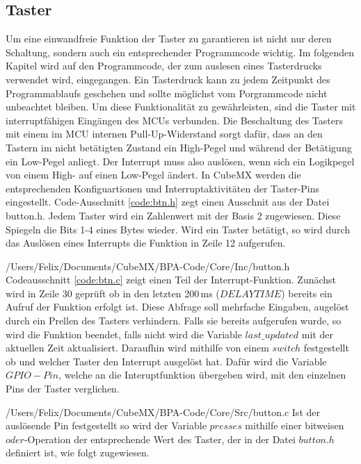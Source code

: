
\subsection{Taster}
Um eine einwandfreie Funktion der Taster zu garantieren ist nicht nur deren Schaltung, sondern auch ein entsprechender Programmcode wichtig. Im folgenden Kapitel wird auf den Programmcode, der zum auslesen eines Tasterdrucks verwendet wird, eingegangen. Ein Tasterdruck kann zu jedem Zeitpunkt des Programmablaufs geschehen und sollte möglichst vom Porgrammcode nicht unbeachtet bleiben. Um diese Funktionalität zu gewährleisten, sind die Taster mit interruptfähigen Eingängen des MCUs verbunden. Die Beschaltung des Tasters mit einem im MCU internen Pull-Up-Widerstand sorgt dafür, dass an den Tastern im nicht betätigten Zustand ein High-Pegel und während der Betätigung ein Low-Pegel anliegt. Der Interrupt muss also auslösen, wenn sich ein Logikpegel von einem High- auf einen Low-Pegel ändert. In CubeMX werden die entsprechenden Konfiguartionen und Interruptaktivitäten der Taster-Pins eingestellt. Code-Ausschnitt \ref{code:btn.h} zegt einen Ausschnit aus der Datei button.h. Jedem Taster wird ein Zahlenwert mit der Basis 2 zugewiesen. Diese Spiegeln die Bits 1-4 eines Bytes wieder. Wird ein Taster betätigt, so wird  durch das Auslösen eines Interrupts die Funktion in Zeile 12 aufgerufen.

{/Users/Felix/Documents/CubeMX/BPA-Code/Core/Inc/button.h} 
Codeausschnitt \ref{code:btn.c} zeigt einen Teil der Interrupt-Funktion. Zunächst wird in Zeile 30 geprüft ob in den letzten 200\,ms ($DELAYTIME$) bereits ein Aufruf der Funktion erfolgt ist. Diese Abfrage soll mehrfache Eingaben, augelöst durch ein Prellen des Tasters verhindern. Falls sie bereits aufgerufen wurde, so wird die Funktion beendet, falls nicht wird die Variable $last\_updated$ mit der aktuellen Zeit aktualisiert. Daraufhin wird mithilfe von einem $switch$ festgestellt ob und welcher Taster den Interrupt ausgelöst hat. Dafür wird die Variable $GPIO-Pin$, welche an die Interuptfunktion übergeben wird, mit den einzelnen Pins der Taster verglichen. 

{/Users/Felix/Documents/CubeMX/BPA-Code/Core/Src/button.c}
Ist der auslösende Pin festgestellt so wird der Variable $presses$ mithilfe einer bitweisen $oder$-Operation der entsprechende Wert des Taster, der in der Datei $button.h$ definiert ist, wie folgt zugewiesen.
